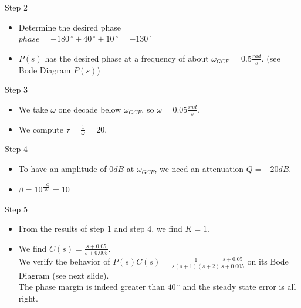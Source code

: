 \begin{frame}
\begin{exampleblock}{Step 2}
	\begin{itemize}

\item Determine the desired phase \\ $phase = -180\,^{\circ} + 40\,^{\circ} + 10\,^{\circ} = -130\,^{\circ}$ \\
\item $P(s)$ has the desired phase at a frequency of about $\omega_{GCF}$ = $0.5 \frac{rad}{s}$. (see Bode Diagram $P(s)$) \\
	\end{itemize}
\end{exampleblock}
\begin{exampleblock}{Step 3}
	\begin{itemize}
		\item We take $\omega$ one decade below $\omega_{GCF}$, so $\omega = 0.05 \frac{rad}{s}$. 
		\item We compute $\tau = \frac{1}{\omega} = 20$.
	\end{itemize}
\end{exampleblock}
\end{frame}

\begin{frame}
\begin{exampleblock}{Step 4}
\begin{itemize}
\item To have an amplitude of $0 dB$ at $\omega_{GCF}$, we need an attenuation $Q = -20 dB$.
\item $\beta = 10^{\frac{-Q}{20}} = 10$
\end{itemize}
\end{exampleblock}
\begin{exampleblock}{Step 5}
\begin{itemize}
\item From the results of step 1 and step 4, we find $K = 1$.
\item We find $C(s) = \frac{s + 0.05}{s + 0.005}$. \\ We verify the behavior of $P(s)C(s) = \frac{1}{s(s+1)(s+2)}\frac{s + 0.05}{s + 0.005}$ on its Bode Diagram (see next slide). \\
The phase margin is indeed greater than $40\,^{\circ}$ and the steady state error is all right.
\end{itemize}
\end{exampleblock}
\end{frame}


